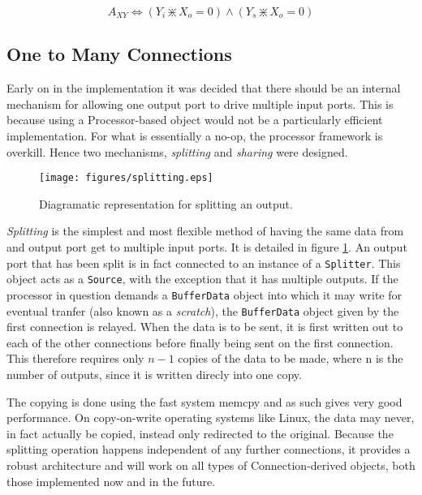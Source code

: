 \begin{equation}
A_{XY} \Leftrightarrow (Y_i \divideontimes X_o = 0) \wedge (Y_s \divideontimes X_o = 0)
\end{equation}




\subsection{One to Many Connections}\label{sec:onetomany}

Early on in the implementation it was decided that there should be an internal mechanism for allowing one output port to drive multiple input ports. This is because using a Processor-based object would not be a particularly efficient implementation. For what is essentially a no-op, the processor framework is overkill. Hence two mechanisms, \textit{splitting} and \textit{sharing} were designed.

\begin{figure}[ht!]
\centering
\texttt{[image: figures/splitting.eps]}
\caption{Diagramatic representation for splitting an output.}
\label{fig:splitting}
\end{figure}

\textit{Splitting} is the simplest and most flexible method of having the same data from and output port get to multiple input ports. It is detailed in figure \ref{fig:splitting}. An output port that has been split is in fact connected to an instance of a \texttt{Splitter}. This object acts as a \texttt{Source}, with the exception that it has multiple outputs. If the processor in question demands a \texttt{BufferData} object into which it may write for eventual tranfer (also known as a \textit{scratch}), the \texttt{BufferData} object given by the first connection is relayed. When the data is to be sent, it is first written out to each of the other connections before finally being sent on the first connection. This therefore requires only $n - 1$ copies of the data to be made, where n is the number of outputs, since it is written direcly into one copy.

The copying is done using the fast system memcpy and as such gives very good performance. On copy-on-write operating systems like Linux, the data may never, in fact actually be copied, instead only redirected to the original. Because the splitting operation happens independent of any further connections, it provides a robust architecture and will work on all types of Connection-derived objects, both those implemented now and in the future.

